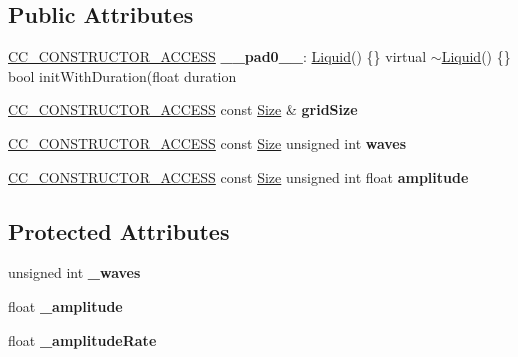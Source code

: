 \subsection*{Public Attributes}
\begin{DoxyCompactItemize}
\item 
\mbox{\label{classLiquid_a93f805599a355399aca4750e4e2a7257}} 
\hyperlink{_2cocos2d_2cocos_2base_2ccConfig_8h_a25ef1314f97c35a2ed3d029b0ead6da0}{C\+C\+\_\+\+C\+O\+N\+S\+T\+R\+U\+C\+T\+O\+R\+\_\+\+A\+C\+C\+E\+SS} {\bfseries \+\_\+\+\_\+pad0\+\_\+\+\_\+}\+: \hyperlink{classLiquid}{Liquid}() \{\} virtual $\sim$\hyperlink{classLiquid}{Liquid}() \{\} bool init\+With\+Duration(float duration
\item 
\mbox{\label{classLiquid_ac39c6124e4f9c8d871f06a0f0d1f3e80}} 
\hyperlink{_2cocos2d_2cocos_2base_2ccConfig_8h_a25ef1314f97c35a2ed3d029b0ead6da0}{C\+C\+\_\+\+C\+O\+N\+S\+T\+R\+U\+C\+T\+O\+R\+\_\+\+A\+C\+C\+E\+SS} const \hyperlink{classSize}{Size} \& {\bfseries grid\+Size}
\item 
\mbox{\label{classLiquid_a82eada8691f29e5758ff27782036408e}} 
\hyperlink{_2cocos2d_2cocos_2base_2ccConfig_8h_a25ef1314f97c35a2ed3d029b0ead6da0}{C\+C\+\_\+\+C\+O\+N\+S\+T\+R\+U\+C\+T\+O\+R\+\_\+\+A\+C\+C\+E\+SS} const \hyperlink{classSize}{Size} unsigned int {\bfseries waves}
\item 
\mbox{\label{classLiquid_a50a6f3d5b66b6a4949ef6c653a5f9e0f}} 
\hyperlink{_2cocos2d_2cocos_2base_2ccConfig_8h_a25ef1314f97c35a2ed3d029b0ead6da0}{C\+C\+\_\+\+C\+O\+N\+S\+T\+R\+U\+C\+T\+O\+R\+\_\+\+A\+C\+C\+E\+SS} const \hyperlink{classSize}{Size} unsigned int float {\bfseries amplitude}
\end{DoxyCompactItemize}
\subsection*{Protected Attributes}
\begin{DoxyCompactItemize}
\item 
\mbox{\label{classLiquid_afdd0ffc4100e3b43035c42e2c131c743}} 
unsigned int {\bfseries \+\_\+waves}
\item 
\mbox{\label{classLiquid_aeba8d9593575aa0b41ef5cf78cd2c534}} 
float {\bfseries \+\_\+amplitude}
\item 
\mbox{\label{classLiquid_a71a1743066253eb4c23f081f6bb7de44}} 
float {\bfseries \+\_\+amplitude\+Rate}
\end{DoxyCompactItemize}
